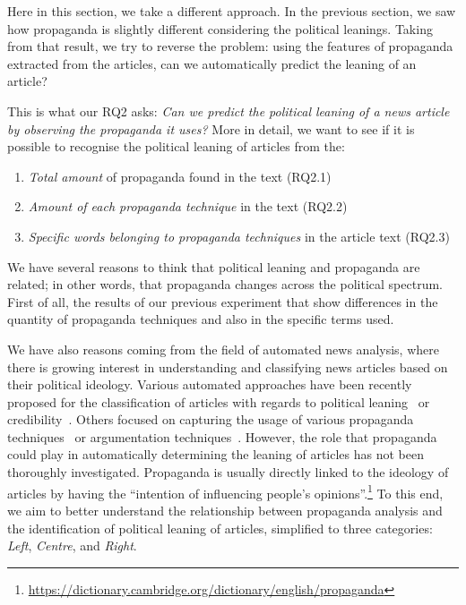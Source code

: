 Here in this section, we take a different approach.
In the previous section, we saw how propaganda is slightly different considering the political leanings.
Taking from that result, we try to reverse the problem: using the features of propaganda extracted from the articles, can we automatically predict the leaning of an article?

This is what our RQ2 asks: \emph{Can we predict the political leaning of a news article by observing the propaganda it uses?}
More in detail, we want to see if it is possible to recognise the political leaning of articles from the:
\begin{enumerate}
    \item \emph{Total amount} of propaganda found in the text (RQ2.1)
    \item \emph{Amount of each propaganda technique} in the text (RQ2.2)
    \item \emph{Specific words belonging to propaganda techniques} in the article text (RQ2.3)
\end{enumerate}

We have several reasons to think that political leaning and propaganda are related; in other words, that propaganda changes across the political spectrum.
First of all, the results of our previous experiment that show differences in the quantity of propaganda techniques and also in the specific terms used.

We have also reasons coming from the field of automated news analysis, where there is growing interest in understanding and classifying news articles based on their political ideology.
Various automated approaches have been recently proposed for the classification of articles with regards to political leaning~\cite{baly2020we} or credibility~\cite{horne2018assessing}. Others focused on capturing the usage of various propaganda techniques~\cite{da2019fine} or argumentation techniques~\cite{lippi2016argumentation}. However, the role that propaganda could play in automatically determining the leaning of articles has not been thoroughly investigated.
Propaganda is usually directly linked to the ideology of articles by having the ``intention of influencing people's opinions''.\footnote{\url{https://dictionary.cambridge.org/dictionary/english/propaganda}} To this end, we aim to better understand the relationship between propaganda analysis and the identification of political leaning of articles, simplified to three categories: \textit{Left}, \textit{Centre}, and \textit{Right}.

